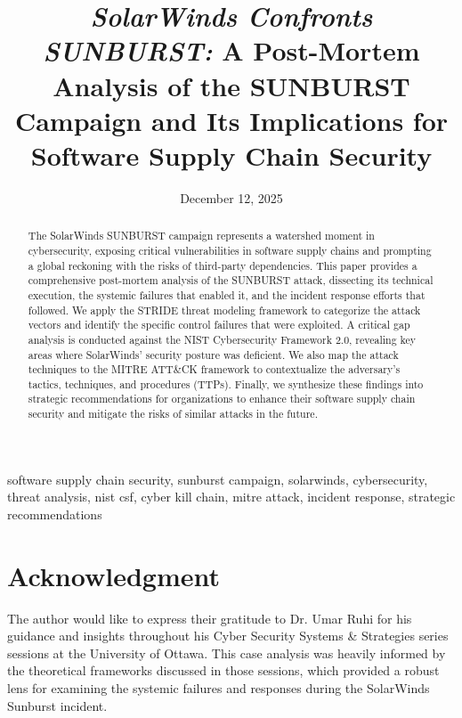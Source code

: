 \documentclass{ieee-portfolio}
\title{\textit{SolarWinds Confronts SUNBURST:} A Post-Mortem Analysis of the SUNBURST Campaign and Its Implications for Software Supply Chain Security}
\date{December 12, 2025}
\author{
    \IEEEauthorblockN{Jaxen Anirban Dutta \orcidlink{0000-0002-1234-5678}}
    \IEEEauthorblockA{\textit{School of Engineering Design and Teaching Innovation} \\
    \textit{University of Ottawa, Ottawa, Ontario, Canada} \\
    adutt042@uottawa.ca}
}
\begin{document}
\maketitle

\begin{abstract}
The SolarWinds SUNBURST campaign represents a watershed moment in cybersecurity, exposing critical vulnerabilities in software supply chains and prompting a global reckoning with the risks of third-party dependencies. This paper provides a comprehensive post-mortem analysis of the SUNBURST attack, dissecting its technical execution, the systemic failures that enabled it, and the incident response efforts that followed. We apply the STRIDE threat modeling framework to categorize the attack vectors and identify the specific control failures that were exploited. A critical gap analysis is conducted against the NIST Cybersecurity Framework 2.0, revealing key areas where SolarWinds' security posture was deficient. We also map the attack techniques to the MITRE ATT\&CK framework to contextualize the adversary's tactics, techniques, and procedures (TTPs). Finally, we synthesize these findings into strategic recommendations for organizations to enhance their software supply chain security and mitigate the risks of similar attacks in the future.
\end{abstract}

\begin{IEEEkeywords}
software supply chain security, sunburst campaign, solarwinds, cybersecurity, threat analysis, nist csf, cyber kill chain, mitre attack, incident response, strategic recommendations
\end{IEEEkeywords}











\section*{Acknowledgment}
The author would like to express their gratitude to Dr. Umar Ruhi for his guidance and insights throughout his Cyber Security Systems \& Strategies series sessions at the University of Ottawa. This case analysis was heavily informed by the theoretical frameworks discussed in those sessions, which provided a robust lens for examining the systemic failures and responses during the SolarWinds Sunburst incident.

\glsaddall
{}
\printglossary[type=\acronymtype,title=List of Acronyms]




\appendices
\onecolumn




\end{document}
